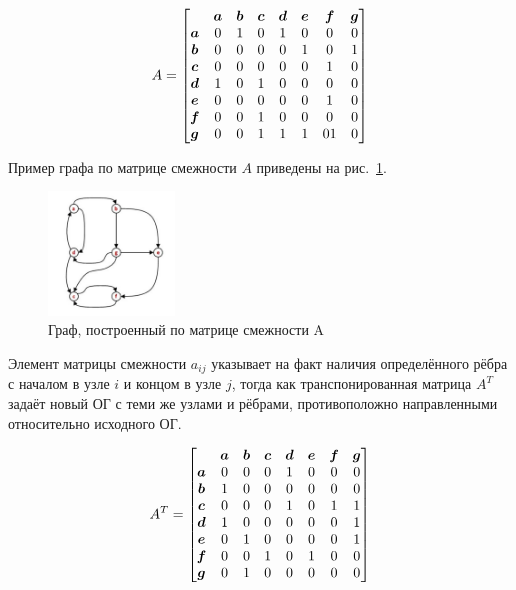 \begin{equation}\label{eq.rndhpcedt.2021.11.14.00}
A=%
\begin{bmatrix}
	&	\bs{a}	&	\bs{b}	&	\bs{c}	&	\bs{d}	&	\bs{e}	&	\bs{f}	&	\bs{g} \\
\bs{a}	&	0	&	1	&	0	& 	1	& 	0	& 	0	 &	 0 \\
\bs{b}	&	0	&	0	&	0	& 	0	& 	1	& 	0	 &	 1 \\
\bs{c}	&	0	&	0	&	0	& 	0	& 	0	& 	1	 &	 0 \\
\bs{d}	&	1	&	0	&	1	& 	0	& 	0	& 	0	 &	 0 \\
\bs{e}	&	0	&	0	&	0	& 	0	& 	0	& 	1	 &	 0 \\
\bs{f}	&	0	&	0	&	1	& 	0	& 	0	& 	0	 &	 0 \\
\bs{g}	&	0	&	0	&	1	& 	1	& 	1	& 	01	 &	 0 \\
\end{bmatrix}
\end{equation}

Пример графа по матрице смежности $A$ приведены на рис.~\ref{fig.rndhpcedt.2021.11.14.01}.

\begin{figure}[!ht]
	\centering
	\includegraphics[width=0.3\textwidth]{ResearchNotes/rndhpc_not_edt_2021_11_14/adj_matrix.png}
	\caption{Граф, построенный по матрице смежности A}\label{fig.rndhpcedt.2021.11.14.01}
\end{figure}

Элемент матрицы смежности $a_{ij}$ указывает на факт наличия определённого рёбра с началом в узле $i$ и концом в узле $j$, тогда как транспонированная матрица $A^T$ задаёт новый ОГ с теми же узлами и рёбрами, противоположно направленными относительно исходного ОГ.

\begin{equation}\label{eq.rndhpcedt.2021.11.14.02}
	A^T=%
	\begin{bmatrix}
		&	\bs{a}	&	\bs{b}	&	\bs{c}	&	\bs{d}	&	\bs{e}	&	\bs{f}	&	\bs{g} \\
	\bs{a}	&	0	&	0	&	0	& 	1	& 	0	& 	0	 & 	0 \\
	\bs{b}	&	1	&	0	&	0	& 	0	& 	0	& 	0	 & 	0 \\
	\bs{c}	&	0	&	0	&	0	& 	1	& 	0	& 	1	 & 	1 \\
	\bs{d}	&	1	&	0	&	0	& 	0	& 	0	& 	0	 & 	1 \\
	\bs{e}	&	0	&	1	&	0	& 	0	& 	0	& 	0	 & 	1 \\
	\bs{f}	&	0	&	0	&	1	& 	0	& 	1	& 	0	 & 	0 \\
	\bs{g}	&	0	&	1	&	0	& 	0	& 	0	& 	0	 & 	0 \\
	\end{bmatrix}
	\end{equation}

